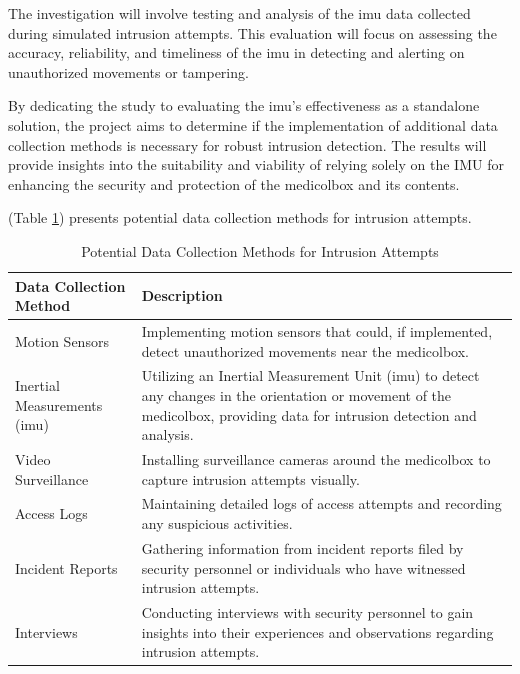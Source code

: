 \documentclass[../main.tex]{subfiles}
\begin{document}
    The investigation will involve testing and analysis of the
    \gls{imu} data collected during simulated \gls{intrusion} attempts.
    This evaluation will focus on assessing the accuracy, reliability,
    and timeliness of the \gls{imu} in detecting and
    alerting on unauthorized movements or tampering.

    By dedicating the study to evaluating the \gls{imu}'s effectiveness as
    a standalone solution, the project aims to determine if the
    implementation of additional data collection methods is necessary for
    robust \gls{intrusion} detection.
    The results will provide insights into the suitability and viability of
    relying solely on the IMU for enhancing the security and
    protection of the \gls{medicolbox} and its contents.

    (Table \ref{tab:PotentialDataCollectionMethodsForIntrusionAttempts})
    presents potential data collection methods for \gls{intrusion} attempts.

    \begin{table}[htbp]
        \centering
        \caption{Potential Data Collection Methods for Intrusion Attempts}
        \label{tab:PotentialDataCollectionMethodsForIntrusionAttempts}
        \begin{tabular}{|l|p{10cm}|}
            \hline
            \textbf{Data Collection Method} & \textbf{Description} \\
            \hline
            Motion Sensors &
            Implementing motion sensors that could, if implemented, detect
            unauthorized movements near the \gls{medicolbox}. \\
            \hline
            Inertial Measurements (\gls{imu}) &
            Utilizing an Inertial Measurement Unit (\gls{imu}) to
            detect any changes in the orientation or
            movement of the \gls{medicolbox},
            providing data for \gls{intrusion} detection and analysis. \\
            \hline
            Video Surveillance &
            Installing surveillance cameras around the
            \gls{medicolbox} to capture \gls{intrusion} attempts visually. \\
            \hline
            Access Logs &
            Maintaining detailed logs of access attempts and
            recording any suspicious activities. \\
            \hline
            Incident Reports &
            Gathering information from incident reports filed by
            security personnel or individuals who
            have witnessed \gls{intrusion} attempts. \\
            \hline
            Interviews &
            Conducting interviews with security personnel to
            gain insights into their experiences and
            observations regarding \gls{intrusion} attempts. \\
            \hline
        \end{tabular}
    \end{table}
\end{document}

